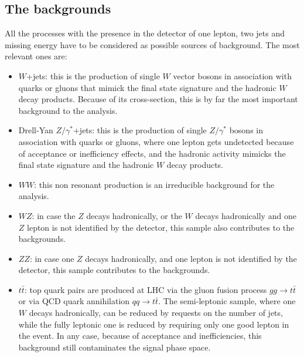 \subsection {The backgrounds}


All the processes with the presence in the detector of one lepton, two jets and missing energy
have to be considered as possible sources of background. The most relevant ones are:
\begin{itemize}
  \item $W$+jets: this is the production of single $W$ vector bosons in association with quarks or gluons 
       that mimick the final state signature and the hadronic $W$ decay products.
       Because of its cross-section, 
       this is by far the most important background to the analysis.
  \item Drell-Yan $Z/\gamma^{*}$+jets: this is the production of single $Z/\gamma^{*}$ bosons 
       in association with quarks or gluons, 
       where one lepton gets undetected because of acceptance or inefficiency effects, 
       and the hadronic activity mimicks the final state signature and the hadronic $W$ decay products.
  \item $WW$: this non resonant production is an irreducible background for the analysis.
  \item $WZ$: in case the $Z$ decays hadronically, or the $W$ decays hadronically 
              and one $Z$ lepton is not identified by the detector,
              this sample also contributes to the backgrounds.
  \item $ZZ$: in case one $Z$ decays hadronically, and one lepton is not identified by the detector,
              this sample contributes to the backgrounds.
  \item $t\bar{t}$: top quark pairs are produced at LHC via the gluon fusion process
              $gg\to{}t\bar{t}$ or via QCD quark annihilation $qq\to{}t\bar{t}$.
              The semi-leptonic sample, where one $W$ decays hadronically,
              can be reduced by requests on the number of jets,
              while the fully leptonic one is reduced by requiring only one good lepton in the event.
              In any case, 
              because of acceptance and inefficiencies, 
              this background still contaminates the signal phase space.      

\end{itemize}
